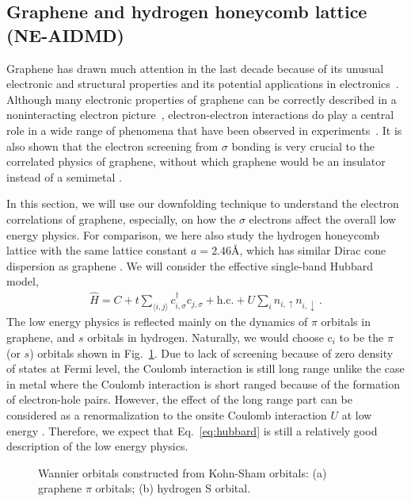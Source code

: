 \documentclass[prl,12pt,onecolumn,nofootinbib,notitlepage,english,superscriptaddress]{revtex4-1}
\begin{document}
\subsection{Graphene and hydrogen honeycomb lattice (NE-AIDMD)}
Graphene has drawn much attention in the last decade because of its unusual electronic and structural properties and its potential applications in electronics~\cite{Wallace1947, Novoselov2004,NovoselovNature2005, Katsnelson2006, Geim2007, Novoselov2007, neto2009, Castro2009}. 
Although many electronic properties of graphene can be correctly described in a noninteracting electron picture~\cite{Castro2009}, electron-electron interactions do play a central role in a wide range of phenomena that have been observed in experiments~\cite{Kotov2012}. It is also shown that the electron screening from $\sigma$ bonding is very crucial to the correlated physics of graphene, without which graphene would be an insulator instead of a semimetal \cite{Zheng2016} .

In this section, we will use our downfolding technique to understand the electron correlations of graphene, especially, on how the $\sigma$ electrons affect the overall low energy physics. For comparison, we here also study the hydrogen honeycomb lattice with the same lattice constant $a=2.46$\AA, which has similar Dirac cone dispersion as graphene \cite{Zheng2016}.  We will consider the effective single-band Hubbard model, 
\begin{eqnarray}\label{eq:hubbard}
\hat{H} = C + t\sum_{\langle i,j\rangle}c_{i, \sigma}^\dagger c_{j, \sigma} + \text{h.c.} + U\sum_{i}n_{i, \uparrow}n_{i, \downarrow}\,. 
\end{eqnarray}
The low energy physics is reflected mainly on the dynamics of $\pi$ orbitals in  graphene, and $s$ orbitals in hydrogen. Naturally, we would choose c$_i$ to be the $\pi$ (or $s$) orbitals shown in Fig.~\ref{fig:wan}. Due to lack of screening because of zero density of states at Fermi level, the Coulomb interaction is still long range unlike the case in metal where the Coulomb interaction is short ranged because of the formation of electron-hole pairs. However, the effect of the long range part can be considered as a renormalization to the onsite Coulomb interaction $U$ at low energy \cite{Schuler2013, Changlani2015}. Therefore, we expect that Eq.~\eqref{eq:hubbard} is still a relatively good description of the low energy physics. 

\begin{figure}[hbt]
  \centering  
       \caption{Wannier orbitals constructed from Kohn-Sham orbitals: (a) graphene $\pi$ orbitals; (b) hydrogen S orbital. }
\label{fig:wan}
\end{figure}
\end{document}
